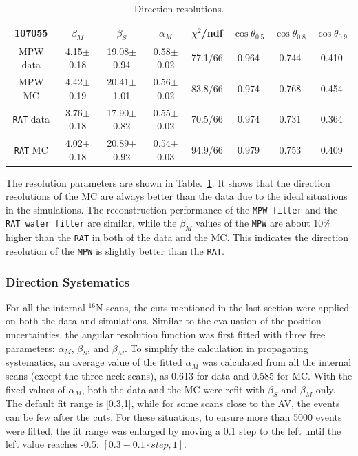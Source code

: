 \begin{table}[ht]
		\caption{Direction resolutions.\label{tab:angularResolValuesUpdated}}
	\begin{tabular}{cccccccc}%
		\toprule
	107055& $\beta_M$ &  $\beta_S$ & $\alpha_M$ & $\chi^2$/ndf & $\cos\theta_{0.5}$ & $\cos\theta_{0.8}$& $\cos\theta_{0.9}$\\
	\hline
	MPW data & 4.15$\pm$0.18 & 19.08$\pm$0.94 & 0.58$\pm$0.02 & 77.1/66 & 0.964 & 0.744 & 0.410 \\
	MPW MC & 4.42$\pm$0.19 & 20.41$\pm$1.01 & 0.56$\pm$0.02 & 83.8/66 & 0.974 & 0.768 & 0.454	 \\	
\hline
	\texttt{RAT} data & 3.76$\pm$0.18 & 17.90$\pm$0.82 & 0.55$\pm$0.02 & 70.5/66 & 0.974 & 0.731 & 0.364 \\
	\texttt{RAT} MC & 4.02$\pm$0.18 & 20.89$\pm$0.92 & 0.54$\pm$0.03 & 94.9/66 & 0.979 & 0.753 & 0.409	\\
		\bottomrule
	\end{tabular}
\end{table}

The resolution parameters are shown in Table.~\ref{tab:angularResolValuesUpdated}. It shows that the direction resolutions of the MC are always better than the data due to the ideal situations in the simulations. The reconstruction performance of the \texttt{MPW fitter} and the \texttt{RAT water fitter} are similar, while the $\beta_M$ values of the \texttt{MPW} are about 10\% higher than the \texttt{RAT} in both of the data and the MC. This indicates the direction resolution of the \texttt{MPW} is slightly better than the \texttt{RAT}.

\subsubsection{Direction Systematics}
For all the internal $^{16}$N scans, the cuts mentioned in the last section were applied on both the data and simulations. Similar to the evaluation of the position uncertainties, the angular resolution function was first fitted with three free parameters: $\alpha_M$, $\beta_S$, and $\beta_M$. To simplify the calculation in propagating systematics, an average value of the fitted $\alpha_M$ was calculated from all the internal scans (except the three neck scans), as 0.613 for data and 0.585 for MC. With the fixed values of $\alpha_M$, both the data and the MC were refit with $\beta_S$ and $\beta_M$ only. The default fit range is [0.3,1], while for some scans close to the AV, the events can be few after the cuts. For these situations, to ensure more than 5000 events were fitted, the fit range was enlarged by moving a 0.1 step to the left until the left value reaches -0.5: $[0.3-0.1\cdot step,1]$.

